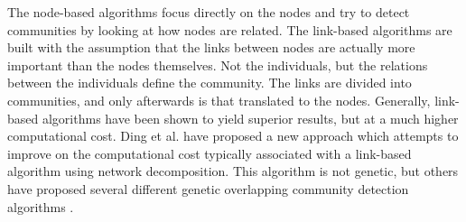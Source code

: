 The node-based algorithms focus directly on the nodes and try to detect communities by looking at how nodes are related. The link-based algorithms are built with the assumption that the links between nodes are actually more important than the nodes themselves. Not the individuals, but the relations between the individuals define the community. The links are divided into communities, and only afterwards is that translated to the nodes. Generally, link-based algorithms have been shown to yield superior results, but at a much higher computational cost. Ding et al. \cite{Ding2016} have proposed a new approach which attempts to improve on the computational cost typically associated with a link-based algorithm using network decomposition. This algorithm is not genetic,  but others have proposed several different genetic overlapping community detection algorithms \cite{Shi2013, Pizzuti2009, Dickinson2013}.\\
